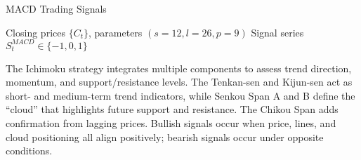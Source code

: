\begin{breakablealgorithm}
\caption{MACD Trading Signals}
\begin{algorithmic}[1]
\Require Closing prices $\{C_t\}$, parameters $(s=12, l=26, p=9)$
\Ensure Signal series $S^{MACD}_t \in \{-1, 0, 1\}$
        \Else
        \EndIf
    \EndIf
\EndFor
{}
\end{algorithmic}
\end{breakablealgorithm}

The Ichimoku strategy integrates multiple components to assess trend direction, momentum, and support/resistance levels. The Tenkan-sen and Kijun-sen act as short- and medium-term trend indicators, while Senkou Span A and B define the “cloud” that highlights future support and resistance. The Chikou Span adds confirmation from lagging prices. Bullish signals occur when price, lines, and cloud positioning all align positively; bearish signals occur under opposite conditions.

